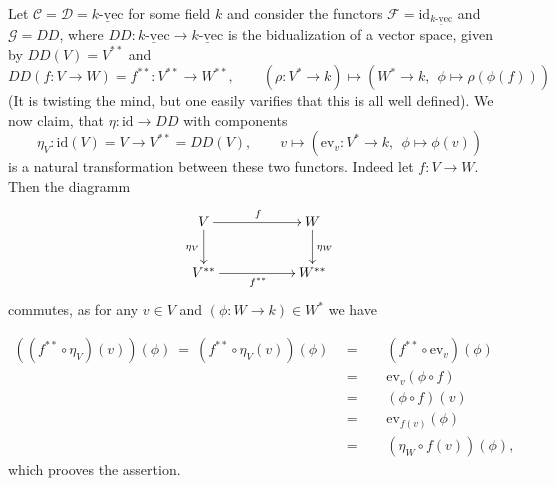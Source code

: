 \documentclass[11pt]{book}
\numberwithin{dummy}{section}
\theoremstyle{nonumberbreak}
\newenvironment{ex}[1][]{\ifthenelse{\equal{#1}{}}{\example}{\example[#1]}\rm}{\endexample}
\newcommand{\kvec}{\underline{k\textrm{-}\mathrm{vec}}}
\newcommand{\C}{\mathcal{C}}
\newcommand{\D}{\mathcal{D}}
\newcommand{\F}{\mathcal{F}}
\newcommand{\G}{\mathcal{G}}
\newcommand{\la}{\longrightarrow}
\newcommand{\id}{\mathrm{id}}
\begin{document}
\begin{spacing}{1.4}
\begin{ex}
Let $\C=\D = \kvec$ for some field $k$ and consider the functors $\F = \id_{\kvec}$ and $\G= DD$, where $DD: \kvec \la \kvec$ is the bidualization of a vector space, given by $DD(V) = V^{**}$ and 
$$DD(f: V \la W) = f^{**}: V^{**} \la W^{**}, \qquad (\rho: V^{*} \la k) \mapsto \left(W^{*} \la k, \ \ \phi \mapsto \rho(\phi(f)) \right)$$
(It is twisting the mind, but one easily varifies that this is all well defined). We now claim, that $\eta: \id \la DD$ with components
$$\eta_V: \id(V)=V \la V^{**}=DD(V), \qquad v \mapsto \left( \mathrm{ev}_v: V^{*} \la k, \ \ \phi \mapsto \phi(v) \right)$$
is a natural transformation between these two functors. Indeed let $f: V \la W$. Then the diagramm
$$
\begin{xy}
\xymatrix{
V \ar[rr]^{f} \ar[d]_{\eta_V} && W \ar[d]^{\eta_W} \\ V^{**} \ar[rr]_{f^{**}} && W^{**}
}
\end{xy}
$$
commutes, as for any $v \in V$ and $(\phi: W \la k) \in W^{*}$ we have

\setlength{\abovedisplayskip}{5.5pt}
\setlength{\belowdisplayskip}{5.5pt}
\begin{alignat*}{5}
\left((f^{**} \circ \eta_V)(v) \right)(\phi) \ = \ \left(f^{**} \circ \eta_V(v)\right)(\phi) \ \ &=&& \ \ (f^{**} \circ \mathrm{ev}_v)(\phi) \\
&=&& \ \  \mathrm{ev}_v(\phi \circ f) \\
&=&& \ \ (\phi \circ f)(v) \\
&=&& \ \ \mathrm{ev}_{f(v)}(\phi) \\
&=&& \ \ (\eta_W \circ f(v))(\phi),
\end{alignat*}
which prooves the assertion.


\end{ex}   %



\end{spacing}
\end{document}
